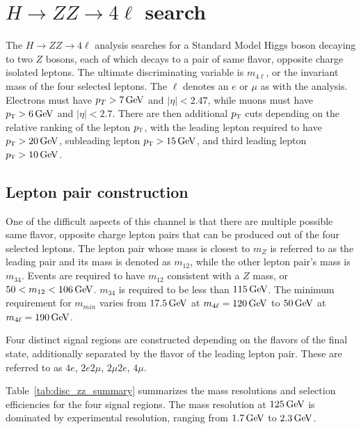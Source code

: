 \section{$H\to ZZ \to 4\ell$ search}

The $H\to ZZ \to 4\ell$ analysis searches for a Standard Model Higgs boson decaying to two $Z$ bosons, each of which decays to a pair of same flavor, opposite charge isolated leptons. The ultimate discriminating variable is $m_{4\ell}$, or the invariant mass of the four selected leptons. The $\ell$ denotes an $e$ or $\mu$ as with the \HWWfull analysis. Electrons must have $p_{T} > 7 \GeV$ and $|\eta| < 2.47$, while muons must have $\pT > 6 \GeV$ and $|\eta| < 2.7$. There are then additional $p_{\textrm{\footnotesize\sc t}}$ cuts depending on the relative ranking of the lepton $p_{\textrm{\footnotesize\sc t}}$, with the leading lepton required to have $\pT > 20 \GeV$, subleading lepton $\pT > 15 \GeV$, and third leading lepton $\pT > 10 \GeV$. 

\subsection{Lepton pair construction}

One of the difficult aspects of this channel is that there are multiple possible same flavor, opposite charge lepton pairs that can be produced out of the four selected leptons. The lepton pair whose mass is closest to $m_Z$ is referred to as the leading pair and its mass is denoted as $m_{12}$, while the other lepton pair's mass is $m_{34}$. Events are required to have $m_{12}$ consistent with a $Z$ mass, or $50 < m_{12} < 106 \GeV$. $m_{34}$ is required to be less than $115 \GeV$. The minimum requirement for $m_{min}$ varies from $17.5 \GeV$ at $m_{4\ell} = 120 \GeV$ to $50 \GeV$ at $m_{4\ell} = 190 \GeV$. 

Four distinct signal regions are constructed depending on the flavors of the final state, additionally separated by the flavor of the leading lepton pair. These are referred to as $4e$, $2e2\mu$, $2\mu2e$, $4\mu$. 

Table~\ref{tab:disc_zz_summary} summarizes the mass resolutions and selection efficiencies for the four signal regions. The mass resolution at $125 \GeV$ is dominated by experimental resolution, ranging from $1.7 \GeV$ to $2.3 \GeV$. 

